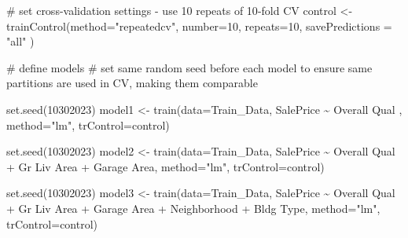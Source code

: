 \documentclass[
  letterpaper,
  DIV=11,
  numbers=noendperiod]{scrreprt}
\newenvironment{Shaded}{\begin{snugshade}}{\end{snugshade}}
\newcommand{\AttributeTok}[1]{\textcolor[rgb]{0.40,0.45,0.13}{#1}}
\newcommand{\CommentTok}[1]{\textcolor[rgb]{0.37,0.37,0.37}{#1}}
\newcommand{\DecValTok}[1]{\textcolor[rgb]{0.68,0.00,0.00}{#1}}
\newcommand{\FunctionTok}[1]{\textcolor[rgb]{0.28,0.35,0.67}{#1}}
\newcommand{\NormalTok}[1]{\textcolor[rgb]{0.00,0.23,0.31}{#1}}
\newcommand{\OtherTok}[1]{\textcolor[rgb]{0.00,0.23,0.31}{#1}}
\newcommand{\SpecialCharTok}[1]{\textcolor[rgb]{0.37,0.37,0.37}{#1}}
\newcommand{\StringTok}[1]{\textcolor[rgb]{0.13,0.47,0.30}{#1}}
\begin{document}
\begin{Shaded}
\begin{Highlighting}[]
\CommentTok{\# set cross{-}validation settings {-} use 10 repeats of 10{-}fold CV}
\NormalTok{control }\OtherTok{\textless{}{-}} \FunctionTok{trainControl}\NormalTok{(}\AttributeTok{method=}\StringTok{"repeatedcv"}\NormalTok{, }\AttributeTok{number=}\DecValTok{10}\NormalTok{, }\AttributeTok{repeats=}\DecValTok{10}\NormalTok{, }\AttributeTok{savePredictions =} \StringTok{"all"}\NormalTok{ )}

\CommentTok{\# define models}
\CommentTok{\# set same random seed before each model to ensure same partitions are used in CV, making them comparable}

\FunctionTok{set.seed}\NormalTok{(}\DecValTok{10302023}\NormalTok{)   }
\NormalTok{model1 }\OtherTok{\textless{}{-}} \FunctionTok{train}\NormalTok{(}\AttributeTok{data=}\NormalTok{Train\_Data, }
\NormalTok{                SalePrice }\SpecialCharTok{\textasciitilde{}} \StringTok{\textasciigrave{}}\AttributeTok{Overall Qual}\StringTok{\textasciigrave{}}\NormalTok{ ,  }
                \AttributeTok{method=}\StringTok{"lm"}\NormalTok{, }\AttributeTok{trControl=}\NormalTok{control)}

\FunctionTok{set.seed}\NormalTok{(}\DecValTok{10302023}\NormalTok{) }
\NormalTok{model2 }\OtherTok{\textless{}{-}} \FunctionTok{train}\NormalTok{(}\AttributeTok{data=}\NormalTok{Train\_Data, }
\NormalTok{                SalePrice }\SpecialCharTok{\textasciitilde{}} \StringTok{\textasciigrave{}}\AttributeTok{Overall Qual}\StringTok{\textasciigrave{}} \SpecialCharTok{+}  \StringTok{\textasciigrave{}}\AttributeTok{Gr Liv Area}\StringTok{\textasciigrave{}} \SpecialCharTok{+} \StringTok{\textasciigrave{}}\AttributeTok{Garage Area}\StringTok{\textasciigrave{}}\NormalTok{,  }
                \AttributeTok{method=}\StringTok{"lm"}\NormalTok{, }\AttributeTok{trControl=}\NormalTok{control)}

\FunctionTok{set.seed}\NormalTok{(}\DecValTok{10302023}\NormalTok{) }
\NormalTok{model3 }\OtherTok{\textless{}{-}} \FunctionTok{train}\NormalTok{(}\AttributeTok{data=}\NormalTok{Train\_Data, SalePrice }\SpecialCharTok{\textasciitilde{}} \StringTok{\textasciigrave{}}\AttributeTok{Overall Qual}\StringTok{\textasciigrave{}} \SpecialCharTok{+} 
                  \StringTok{\textasciigrave{}}\AttributeTok{Gr Liv Area}\StringTok{\textasciigrave{}} \SpecialCharTok{+} \StringTok{\textasciigrave{}}\AttributeTok{Garage Area}\StringTok{\textasciigrave{}} \SpecialCharTok{+} 
                  \StringTok{\textasciigrave{}}\AttributeTok{Neighborhood}\StringTok{\textasciigrave{}} \SpecialCharTok{+} \StringTok{\textasciigrave{}}\AttributeTok{Bldg Type}\StringTok{\textasciigrave{}}\NormalTok{,  }
                \AttributeTok{method=}\StringTok{"lm"}\NormalTok{, }\AttributeTok{trControl=}\NormalTok{control)}


\end{Highlighting}
\end{Shaded}
\end{document}
